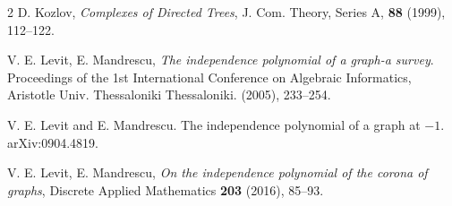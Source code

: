 \documentclass[12pt,amscd]{amsart}
\theoremstyle{definition}
\numberwithin{equation}{section}
\begin{document}
\begin{thebibliography}{2}
 D. Kozlov, \emph{Complexes of Directed Trees}, J. Com. Theory, Series A, \textbf{88} (1999), 112--122.


  V. E. Levit, E. Mandrescu, \emph{The independence polynomial of a graph-a survey}.   Proceedings of the 1st International Conference on Algebraic Informatics, Aristotle Univ. Thessaloniki Thessaloniki. (2005), 233--254. 




 


 V. E. Levit and E. Mandrescu. The independence polynomial of a graph at $-1$. arXiv:0904.4819.

 

 
V. E. Levit, E. Mandrescu, \emph{On the  independence polynomial of the corona of graphs}, Discrete Applied Mathematics {\bf 203} (2016), 85--93.





  


\end{thebibliography}
\end{document}
